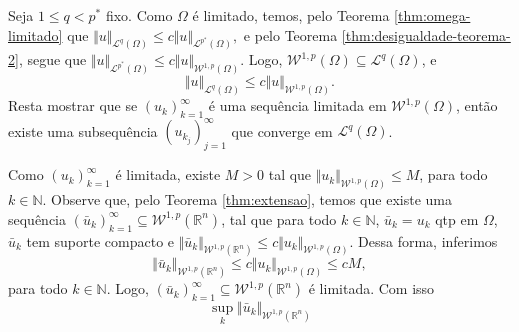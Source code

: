 \documentclass[a4paper, 11pt]{book}
\theoremstyle{definition}
\newcommand{\bN}{\mathbb{N}}
\newcommand{\bR}{\mathbb{R}}
\newcommand{\cL}{\mathcal{L}}
\newcommand{\cW}{\mathcal{W}}
\begin{document}
\begin{prf}
    Seja $1 \leqslant q < p^*$ fixo.
    Como $\Omega$ é limitado, temos, pelo Teorema \ref{thm:omega-limitado} que $\Vert u \Vert_{\cL^q(\Omega)} \leqslant c \Vert u \Vert_{\cL^{p^*}(\Omega)},$
    e pelo Teorema \ref{thm:desigualdade-teorema-2}, segue que
    $\Vert u \Vert_{\cL^{p^*}(\Omega)} \leqslant c \Vert u \Vert_{\cW^{1,p}(\Omega)}$.
    Logo, $\cW^{1,p}(\Omega) \subseteq \cL^q(\Omega)$, e
    \[
        \Vert u \Vert_{\cL^q(\Omega)} \leqslant c \Vert u \Vert_{\cW^{1,p}(\Omega)}.
    \]
    Resta mostrar que se $(u_k)_{k=1}^\infty$ é uma sequência limitada em $\cW^{1,p}(\Omega)$, então existe uma subsequência $(u_{k_j})_{j=1}^\infty$ que converge em $\cL^q(\Omega)$.
    
    Como $(u_k)_{k=1}^\infty$ é limitada, existe $M > 0$ tal que $\Vert u_k \Vert_{\cW^{1,p}(\Omega)} \leqslant M$, para todo $k \in \bN$.
    Observe que, pelo Teorema \ref{thm:extensao}, temos que existe uma sequência $(\bar u_k)_{k=1}^\infty \subseteq \cW^{1,p}(\bR^n)$, tal que para todo $k \in \bN$, $\bar u_k = u_k$ qtp em $\Omega$, $\bar u_k$ tem suporte compacto e $\Vert \bar u_k \Vert_{\cW^{1,p}(\bR^n)} \leqslant c \Vert u_k \Vert_{\cW^{1,p}(\Omega)}$.
    Dessa forma, inferimos
    \[
        \Vert \bar u_k \Vert_{\cW^{1,p}(\bR^n)} \leqslant c \Vert u_k \Vert_{\cW^{1,p}(\Omega)} \leqslant cM,
    \]
    para todo $k \in \bN$.
    Logo, $(\bar u_k)_{k=1}^\infty \subseteq \cW^{1,p}(\bR^n)$ é limitada.
    Com isso
    \begin{equation} \label{eq:supfinito}
        \sup_{k} \Vert \bar u_k \Vert_{\cW^{1,p}(\bR^n)}
    \end{equation}


\end{prf}
\end{document}
